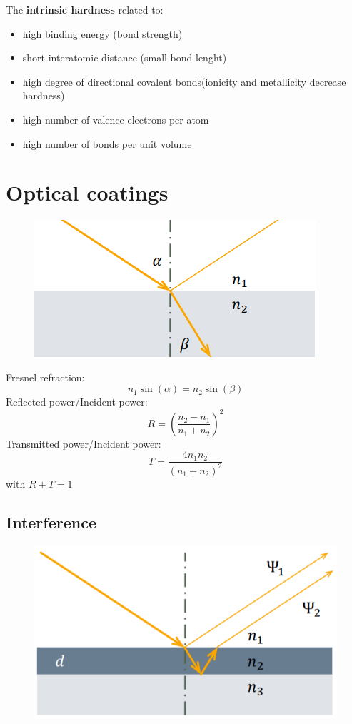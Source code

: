 The \textbf{intrinsic hardness }related to:
\begin{itemize}
    \item high binding energy (bond strength)
    \item short interatomic distance (small bond lenght)
    \item high degree of directional covalent bonds(ionicity and metallicity decrease hardness)
    \item high number of valence electrons per atom
    \item high number of bonds per unit volume
\end{itemize}

\section{Optical coatings}
\begin{figure}[h]
    \centering
    \includegraphics[width=0.7\columnwidth]{images/fresnel.png}
    \label{fig:fresnel}
\end{figure}
Fresnel refraction:
\[
n_1 \sin(\alpha) = n_2 \sin(\beta)
\]
Reflected power/Incident power:
\[
R = \left(\frac{n_2-n_1}{n_1 + n_2}\right)^2
\]
Transmitted power/Incident power:
\[
T = \frac{4n_1n_2}{\left(n_1+n_2\right)^2}
\]
with \(R + T = 1\)

\subsection{Interference}
\begin{figure}[h]
    \centering
    \includegraphics[width=0.7\columnwidth]{images/ThimFilmInterference.png}
    \label{fig:fresnel}
\end{figure}


